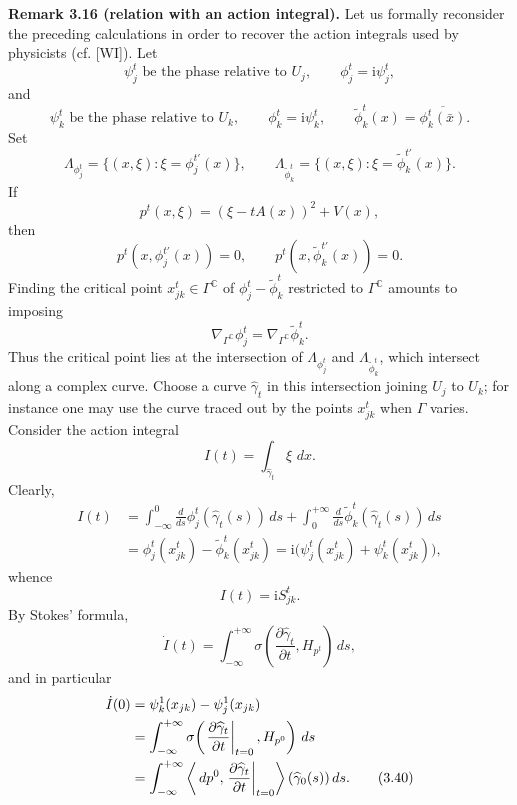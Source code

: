 \documentclass[11pt]{article}
\newcommand{\C}{\mathbb{C}}
\newcommand{\dd}{\,d}
\newcommand{\ii}{\mathrm{i}}
\begin{document}
\medskip
\noindent\textbf{Remark 3.16 (relation with an action integral).}
Let us formally reconsider the preceding calculations in order to recover the action integrals used by physicists (cf. [WI]). Let
\[
\psi_j^t\text{ be the phase relative to }U_j,
\qquad \phi_j^t=\ii\psi_j^t,
\]
and
\[
\psi_k^t\text{ be the phase relative to }U_k,
\qquad \phi_k^t=\ii\psi_k^t,
\qquad \widetilde\phi_k^t(x)=\overline{\phi_k^t(\bar x)}.
\]
Set
\[
\Lambda_{\phi_j^t}=\{(x,\xi):\xi=\phi_j^{t\prime}(x)\},
\qquad
\Lambda_{\widetilde\phi_k^t}=\{(x,\xi):\xi=\widetilde\phi_k^{t\prime}(x)\}.
\]
If
\[
p^t(x,\xi)=(\xi-tA(x))^2+V(x),
\]
then
\begin{equation}
p^t(x,\phi_j^{t\prime}(x))=0,
\qquad
p^t(x,\widetilde\phi_k^{t\prime}(x))=0.
\tag{3.35}
\end{equation}
Finding the critical point $x_{jk}^t\in\Gamma^{\C}$ of
$\phi_j^t-\widetilde\phi_k^t$ restricted to $\Gamma^{\C}$ amounts to imposing
\begin{equation}
\nabla_{\Gamma^{\C}}\phi_j^t
=\nabla_{\Gamma^{\C}}\widetilde\phi_k^t.
\tag{3.36}
\end{equation}
Thus the critical point lies at the intersection of
$\Lambda_{\phi_j^t}$ and $\Lambda_{\widetilde\phi_k^t}$, which intersect along a complex curve. Choose a curve $\widehat\gamma_t$ in this intersection joining $U_j$ to $U_k$; for instance one may use the curve traced out by the points $x_{jk}^t$ when $\Gamma$ varies. Consider the action integral
\begin{equation}
I(t)=\int_{\widehat\gamma_t}\xi\,\dd x.
\tag{3.37}
\end{equation}
Clearly,
\begin{align*}
I(t)
&=\int_{-\infty}^{0}\frac{d}{ds}
\phi_j^t(\widehat\gamma_t(s))\dd s
 +\int_{0}^{+\infty}\frac{d}{ds}
\widetilde\phi_k^t(\widehat\gamma_t(s))\dd s\\
&=\phi_j^t(x_{jk}^t)-\widetilde\phi_k^t(x_{jk}^t)
=\ii\bigl(\psi_j^t(x_{jk}^t)+\psi_k^t(x_{jk}^t)\bigr),
\end{align*}
whence
\begin{equation}
I(t)=\ii S_{jk}^t.
\tag{3.38}
\end{equation}
By Stokes' formula,
\begin{equation}
\dot I(t)=\int_{-\infty}^{+\infty}
\sigma\!\left(\frac{\partial\widehat\gamma_t}{\partial t},H_{p^t}\right)\dd s,
\tag{3.39}
\end{equation}
and in particular
\begin{align}
\dot I(0)
&=\psi_k^1(x_{jk})-\psi_j^1(x_{jk})\notag\\
&=\int_{-\infty}^{+\infty}
\sigma\!\left(
\left.\frac{\partial\widehat\gamma_t}{\partial t}\right|_{t=0},H_{p^0}
\right)\dd s\notag\\
&=\int_{-\infty}^{+\infty}
\left\langle \dd p^0,
\left.\frac{\partial\widehat\gamma_t}{\partial t}\right|_{t=0}
\right\rangle(\widehat\gamma_0(s))\dd s.
\tag{3.40}
\end{align}
\end{document}
